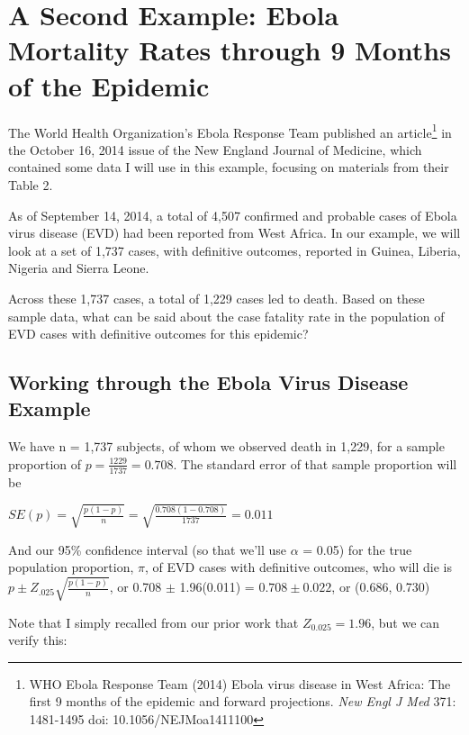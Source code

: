 \documentclass[
]{book}
\begin{document}
\hypertarget{a-second-example-ebola-mortality-rates-through-9-months-of-the-epidemic}{%
\section{A Second Example: Ebola Mortality Rates through 9 Months of the Epidemic}\label{a-second-example-ebola-mortality-rates-through-9-months-of-the-epidemic}}

The World Health Organization's Ebola Response Team published an article\footnote{WHO Ebola Response Team (2014) Ebola virus disease in West Africa: The first 9 months of the epidemic and forward projections. {\it New Engl J Med} 371: 1481-1495 doi: 10.1056/NEJMoa1411100} in the October 16, 2014 issue of the New England Journal of Medicine, which contained some data I will use in this example, focusing on materials from their Table 2.

As of September 14, 2014, a total of 4,507 confirmed and probable cases of Ebola virus disease (EVD) had been reported from West Africa. In our example, we will look at a set of 1,737 cases, with definitive outcomes, reported in Guinea, Liberia, Nigeria and Sierra Leone.

Across these 1,737 cases, a total of 1,229 cases led to death. Based on these sample data, what can be said about the case fatality rate in the population of EVD cases with definitive outcomes for this epidemic?

\hypertarget{working-through-the-ebola-virus-disease-example}{%
\subsection{Working through the Ebola Virus Disease Example}\label{working-through-the-ebola-virus-disease-example}}

We have n = 1,737 subjects, of whom we observed death in 1,229, for a sample proportion of \(p = \frac{1229}{1737} = 0.708\). The standard error of that sample proportion will be

\(SE(p) = \sqrt{\frac{p(1-p)}{n}} = \sqrt{\frac{0.708(1-0.708)}{1737}} = 0.011\)

And our 95\% confidence interval (so that we'll use \(\alpha\) = 0.05) for the true population proportion, \(\pi\), of EVD cases with definitive outcomes, who will die is
\(p \pm Z_{.025} \sqrt{\frac{p(1-p)}{n}}\), or 0.708 \(\pm\) 1.96(0.011) = \(0.708 \pm 0.022\), or (0.686, 0.730)

Note that I simply recalled from our prior work that \(Z_{0.025} = 1.96\), but we can verify this:
\end{document}
